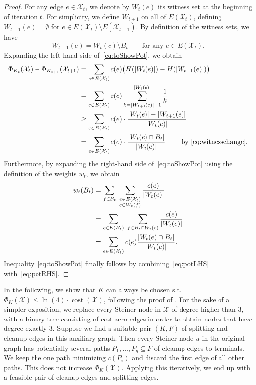 \documentclass[11pt, letterpaper]{article}
\theoremstyle{definition}
\DeclareMathOperator{\cost}{cost}
\newcommand{\grphx}{\mathcal{X}}
\newcommand{\core}{K}
\newcommand{\pot}[2]{\Phi_{#1}(#2)}
\newcommand{\Pot}{\pot{\core}{\grphx}}
\newcommand{\card}[1]{\lvert#1\rvert}
\begin{document}
\begin{proof}
For any edge $e\in \grphx_t$, we denote by $W_t(e)$ its witness
set at the beginning of iteration $t$.
For simplicity, we define $W_{t+1}$ on all of $E(\grphx_t)$, defining
$W_{t+1}(e)=\emptyset$ for $e\in E(\grphx_t)\setminus E(\grphx_{t+1})$.
By definition of the witness sets, we have
\begin{equation}\label{eq:witnesschange}
	W_{t+1}(e)=W_t(e)\setminus B_t \qquad \text{for any } e\in E(\grphx_t). 
\end{equation}
Expanding the left-hand side of~\eqref{eq:toShowPot}, we obtain
\begin{align}
\pot{K_t}{\grphx_t}-\pot{K_{t+1}}{\grphx_{t+1}}
  &= \sum_{e\in E(\grphx_t)} c(e) \big(H(|W_t(e)|)-H(|W_{t+1}(e)|)\big)\notag\\
  &= \sum_{e\in E(\grphx_t)} c(e) \sum_{k=|W_{t+1}(e)|+1}^{|W_{t}(e)|} \frac{1}{k} \notag\\
  &\geq \sum_{e\in E(\grphx_t)} c(e) \cdot \frac{\card{W_t(e)} - \card{W_{t+1}(e)}}{\card{W_t(e)}} \notag\\
  &= \sum_{e\in E(\grphx_t)} c(e) \cdot \frac{|W_t(e)\cap B_t|}{|W_t(e)|}\label{eq:potLHS} \qquad \text{ by~\eqref{eq:witnesschange}}.
\end{align}
Furthermore, by expanding the right-hand side of~\eqref{eq:toShowPot}
using the definition of the weights $w_t$, we obtain
\begin{align}
w_t(B_t) &= \sum_{f\in B_t}\; \sum_{\substack{e\in E(\grphx_t)\\e\in W_t(f)}}\frac{c(e)}{|W_t(e)|}\notag\\
&= \sum_{e\in E(\grphx_t)}\; \sum_{f\in B_t\cap W_t(e)}\frac{c(e)}{|W_t(e)|}\notag \\
&= \sum_{e\in E(\grphx_t)}c(e)\frac{|W_t(e)\cap B_t|}{|W_t(e)|}.\label{eq:potRHS}
\end{align}
Inequality~\eqref{eq:toShowPot} finally follows by 
combining~\eqref{eq:potLHS} with~\eqref{eq:potRHS}.
\end{proof}

\medskip



In the following, we show that $K$ can always be chosen s.t. 
$\Pot \leq \ln(4) \cdot \cost(\grphx)$, following the proof of \cite{byrka_2010_improved}. For the sake of a simpler exposition, 
we replace every Steiner node in $\grphx$ of degree higher than 3, 
with a binary tree consisting of cost zero edges in order to obtain nodes that
have degree exactly 3. Suppose we find a suitable pair $(K,F)$ of splitting and cleanup
edges in this auxiliary graph. Then every Steiner node $u$ in the 
original graph has potentially several paths $P_1,\ldots,P_q \subseteq F$ of cleanup edges to terminals. We keep the one path 
minimizing $c(P_i)$ and discard the first edge
of all other paths. This does not increase $\Pot$. Applying this iteratively, we end up with a feasible pair of cleanup edges and splitting edges.
\end{document}
